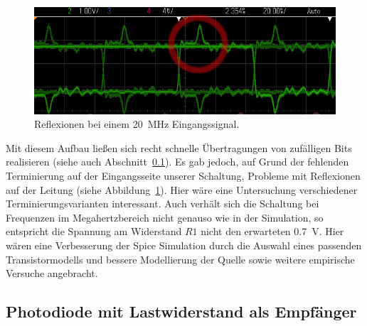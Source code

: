 \documentclass[12pt,a4paper]{article}
\begin{document}
\begin{figure}[H]
  \centering
    \includegraphics[width=1.0\textwidth]{img/ring_20MHz.png}
  \caption{Reflexionen bei einem \SI{20}{\mega\hertz} Eingangssignal.}
  \label{fig:ring_20mhz}
\end{figure}

Mit diesem Aufbau ließen sich recht schnelle Übertragungen von zufälligen Bits realisieren (siehe auch Abschnitt~\ref{sec:direct_rx}). Es gab jedoch, auf Grund der fehlenden Terminierung auf der Eingangsseite unserer Schaltung, Probleme mit Reflexionen auf der Leitung (siehe Abbildung~\ref{fig:ring_20mhz}). Hier wäre eine Untersuchung verschiedener Terminierungsvarianten interessant. Auch verhält sich die Schaltung bei Frequenzen im Megahertzbereich nicht genauso wie in der Simulation, so entspricht die Spannung am Widerstand $R1$ nicht den erwarteten \SI{0.7}{\volt}. Hier wären eine Verbesserung der Spice Simulation durch die Auswahl eines passenden Transistormodells und bessere Modellierung der Quelle sowie weitere empirische Versuche angebracht.

\subsection{Photodiode mit Lastwiderstand als Empfänger}
\label{sec:direct_rx}
\end{document}
